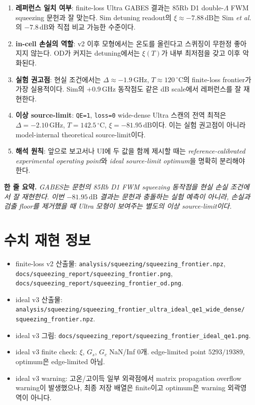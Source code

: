 \documentclass[11pt,a4paper]{article}
\newcommand{\dB}{\,\mathrm{dB}}
\newcommand{\GHz}{\,\mathrm{GHz}}
\newcommand{\degC}{\,^{\circ}\mathrm{C}}
\begin{document}
\begin{enumerate}[nosep]
\item \textbf{레퍼런스 일치 여부}: finite-loss Ultra GABES 결과는 85Rb D1 double-$\Lambda$
      FWM squeezing 문헌과 잘 맞는다. Sim detuning readout의 $\xi\approx-7.88\dB$는
      Sim \textit{et al.}의 $-7.8\dB$와 직접 비교 가능한 수준이다.
\item \textbf{in-cell 손실의 역할}: v2 이후 모형에서는 온도를 올린다고 스퀴징이 무한정
      좋아지지 않는다. OD가 커지는 detuning에서는 $\xi(T)$가 내부 최저점을 갖고 이후
      악화된다.
\item \textbf{실험 권고점}: 현실 조건에서는 $\Delta\approx-1.9\GHz$, $T\approx120\degC$의
      finite-loss frontier가 가장 실용적이다. Sim의 $+0.9\GHz$ 동작점도 같은 dB scale에서
      레퍼런스를 잘 재현한다.
\item \textbf{이상 source-limit}: \texttt{QE=1}, \texttt{loss=0} wide-dense Ultra 스캔의 전역
      최적은 $\Delta=-2.10\GHz$, $T=142.5\degC$, $\xi=-81.95\dB$이다. 이는 실험 권고점이
      아니라 model-internal theoretical source-limit이다.
\item \textbf{해석 원칙}: 앞으로 보고서나 UI에 두 값을 함께 제시할 때는
      \emph{reference-calibrated experimental operating point}와
      \emph{ideal source-limit optimum}을 명확히 분리해야 한다.
\end{enumerate}

\noindent\textbf{한 줄 요약.} \emph{GABES는 문헌의 85Rb D1 FWM squeezing 동작점을 현실 손실
조건에서 잘 재현한다. 이번 $-81.95\dB$ 결과는 문헌과 충돌하는 실험 예측이 아니라,
손실과 검출 floor를 제거했을 때 Ultra 모형이 보여주는 별도의 이상 source-limit이다.}

\appendix
\section{수치 재현 정보}

\begin{itemize}[nosep]
\item finite-loss v2 산출물:
      \texttt{analysis/squeezing/squeezing\_frontier.npz},
      \texttt{docs/squeezing\_report/squeezing\_frontier.png},
      \texttt{docs/squeezing\_report/squeezing\_frontier\_od.png}.
\item ideal v3 산출물:
      \texttt{analysis/squeezing/squeezing\_frontier\_ultra\_ideal\_qe1\_wide\_dense/}
      \texttt{squeezing\_frontier.npz}.
\item ideal v3 그림:
      \texttt{docs/squeezing\_report/squeezing\_frontier\_ideal\_qe1.png}.
\item ideal v3 finite check: $\xi$, $G_s$, $G_c$ NaN/Inf $0$개. edge-limited point
      $5293/19389$, optimum은 edge-limited 아님.
\item ideal v3 warning: 고온/고이득 일부 외곽점에서 matrix propagation overflow warning이
      발생했으나, 최종 저장 배열은 finite이고 optimum은 warning 외곽영역이 아니다.
\end{itemize}
\end{document}
